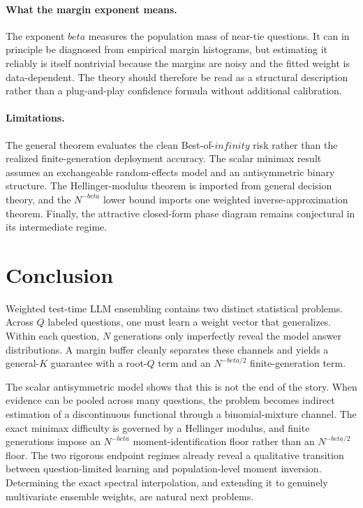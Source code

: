 \documentclass[11pt]{article}
\def\beta{beta}%
\def\infty{infinity}%
\begin{document}
\paragraph{What the margin exponent means.}
The exponent $\beta$ measures the population mass of near-tie questions.  It can in principle be diagnosed from empirical margin histograms, but estimating it reliably is itself nontrivial because the margins are noisy and the fitted weight is data-dependent.  The theory should therefore be read as a structural description rather than a plug-and-play confidence formula without additional calibration.

\paragraph{Limitations.}
The general theorem evaluates the clean Best-of-$\infty$ risk rather than the realized finite-generation deployment accuracy.  The scalar minimax result assumes an exchangeable random-effects model and an antisymmetric binary structure.  The Hellinger-modulus theorem is imported from general decision theory, and the $N^{-\beta}$ lower bound imports one weighted inverse-approximation theorem.  Finally, the attractive closed-form phase diagram remains conjectural in its intermediate regime.

\section{Conclusion}

Weighted test-time LLM ensembling contains two distinct statistical problems.  Across $Q$ labeled questions, one must learn a weight vector that generalizes.  Within each question, $N$ generations only imperfectly reveal the model answer distributions.  A margin buffer cleanly separates these channels and yields a general-$K$ guarantee with a root-$Q$ term and an $N^{-\beta/2}$ finite-generation term.

The scalar antisymmetric model shows that this is not the end of the story.  When evidence can be pooled across many questions, the problem becomes indirect estimation of a discontinuous functional through a binomial-mixture channel.  The exact minimax difficulty is governed by a Hellinger modulus, and finite generations impose an $N^{-\beta}$ moment-identification floor rather than an $N^{-\beta/2}$ floor.  The two rigorous endpoint regimes already reveal a qualitative transition between question-limited learning and population-level moment inversion.  Determining the exact spectral interpolation, and extending it to genuinely multivariate ensemble weights, are natural next problems.
\end{document}

